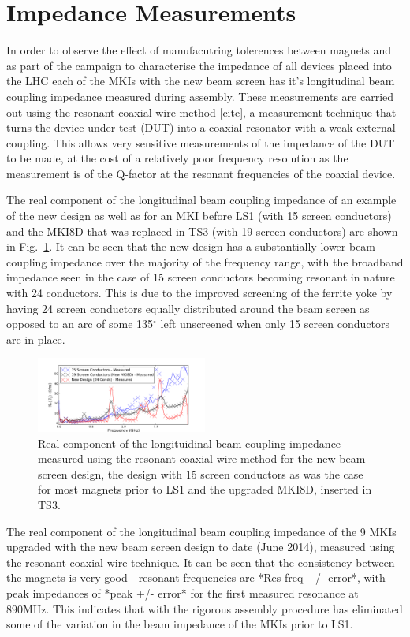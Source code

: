 \documentclass[a4paper,
              ]{jacow}
\begin{document}
\section{Impedance Measurements}

In order to observe the effect of manufacutring tolerences between magnets and as part of the campaign to characterise the impedance of all devices placed into the LHC each of the MKIs with the new beam screen has it's longitudinal beam coupling impedance measured during assembly. These measurements are carried out using the resonant coaxial wire method [cite], a measurement technique that turns the device under test (DUT) into a coaxial resonator with a weak external coupling. This allows very sensitive measurements of the impedance of the DUT to be made, at the cost of a relatively poor frequency resolution as the measurement is of the Q-factor at the resonant frequencies of the coaxial device.

The real component of the longitudinal beam coupling impedance of an example of the new design as well as for an MKI before LS1 (with 15 screen conductors) and the MKI8D that was replaced in TS3 (with 19 screen conductors) are shown in Fig.~\ref{fig:Imp241915}. It can be seen that the new design has a substantially lower beam coupling impedance over the majority of the frequency range, with the broadband impedance seen in the case of 15 screen conductors becoming resonant in nature with 24 conductors. This is due to the improved screening of the ferrite yoke by having 24 screen conductors equally distributed around the beam screen as opposed to an arc of some 135$^{\circ}$ left unscreened when only 15 screen conductors are in place.

\begin{figure}
\includegraphics[width=0.5\textwidth]{measImp151924.pdf}
\caption{Real component of the longituidinal beam coupling impedance measured using the resonant coaxial wire method for the new beam screen design, the design with 15 screen conductors as was the case for most magnets prior to LS1 and the upgraded MKI8D, inserted in TS3.}
\label{fig:Imp241915}
\end{figure}

The real component of the longitudinal beam coupling impedance of the 9 MKIs upgraded with the new beam screen design to date (June 2014), measured using the resonant coaxial wire technique. It can be seen that the consistency between the magnets is very good - resonant frequencies are *Res freq +/- error*, with peak impedances of *peak +/- error* for the first measured resonance at 890MHz. This indicates that with the rigorous assembly procedure has eliminated some of the variation in the beam impedance of the MKIs prior to LS1.
\end{document}
